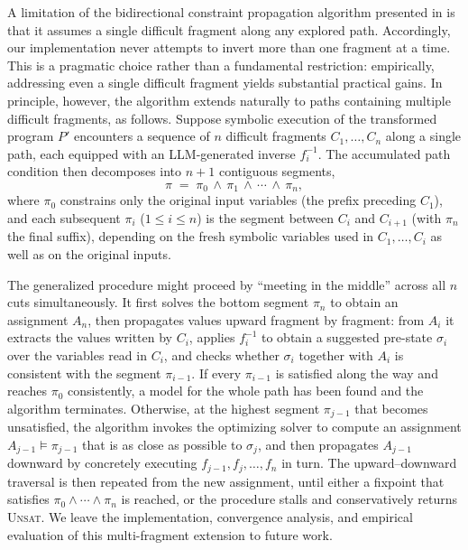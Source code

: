 \documentclass[acmsmall,screen,nonacm]{acmart}
\newenvironment{revblock}{\color{red}}{}
\newenvironment{revblock}{}{}
\theoremstyle{definition}
\begin{document}
\begin{revblock}

A limitation of the bidirectional constraint propagation algorithm presented in  is that it assumes a single difficult fragment along any explored path. Accordingly, our implementation never attempts to invert more than one fragment at a time. This is a pragmatic choice rather than a fundamental restriction: empirically, addressing even a single difficult fragment yields substantial practical gains. In principle, however, the algorithm extends naturally to paths containing multiple difficult fragments, as follows. Suppose symbolic execution of the transformed program $P'$ encounters a sequence of $n$ difficult fragments $C_1,\ldots,C_n$ along a single path, each equipped with an LLM-generated inverse $f_i^{-1}$. The accumulated path condition then decomposes into $n+1$ contiguous segments,
\[
\pi \;=\; \pi_0 \,\wedge\, \pi_1 \,\wedge\, \cdots \,\wedge\, \pi_n,
\]
where $\pi_0$ constrains only the original input variables (the prefix preceding $C_1$), and each subsequent $\pi_i$ ($1\le i\le n$) is the segment between $C_i$ and $C_{i+1}$ (with $\pi_n$ the final suffix), depending on the fresh symbolic variables used in $C_1,\ldots,C_i$ as well as on the original inputs.

The generalized procedure might proceed by ``meeting in the middle'' across all $n$ cuts simultaneously. It first solves the bottom segment $\pi_n$ to obtain an assignment $A_n$, then propagates values upward fragment by fragment: from $A_i$ it extracts the values written by $C_i$, applies $f_i^{-1}$ to obtain a suggested pre-state $\sigma_i$ over the variables read in $C_i$, and checks whether $\sigma_i$ together with $A_i$ is consistent with the segment $\pi_{i-1}$. If every $\pi_{i-1}$ is satisfied along the way and reaches $\pi_0$ consistently, a model for the whole path has been found and the algorithm terminates. Otherwise, at the highest segment $\pi_{j-1}$ that becomes unsatisfied, the algorithm invokes the optimizing solver to compute an assignment $A_{j-1}\models\pi_{j-1}$ that is as close as possible to $\sigma_j$, and then propagates $A_{j-1}$ downward by concretely executing $f_{j-1}, f_j, \ldots, f_n$ in turn. The upward--downward traversal is then repeated from the new assignment, until either a fixpoint that satisfies $\pi_0\wedge\cdots\wedge\pi_n$ is reached, or the procedure stalls and conservatively returns \textsc{Unsat}. We leave the implementation, convergence analysis, and empirical evaluation of this multi-fragment extension to future work.

\end{revblock}
\end{document}
